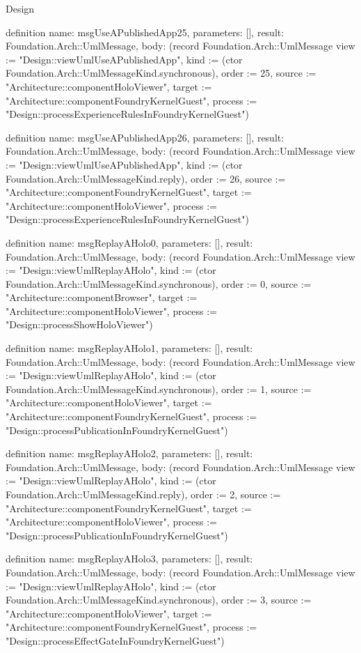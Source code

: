 \begin{lexlean}{Design}
\begin{semanticmodule}
definition{
  name: msgUseAPublishedApp25,
  parameters: [],
  result: Foundation.Arch::UmlMessage,
  body: (record Foundation.Arch::UmlMessage {view := "Design::viewUmlUseAPublishedApp", kind := (ctor Foundation.Arch::UmlMessageKind.synchronous), order := 25, source := "Architecture::componentHoloViewer", target := "Architecture::componentFoundryKernelGuest", process := "Design::processExperienceRulesInFoundryKernelGuest"})
}

definition{
  name: msgUseAPublishedApp26,
  parameters: [],
  result: Foundation.Arch::UmlMessage,
  body: (record Foundation.Arch::UmlMessage {view := "Design::viewUmlUseAPublishedApp", kind := (ctor Foundation.Arch::UmlMessageKind.reply), order := 26, source := "Architecture::componentFoundryKernelGuest", target := "Architecture::componentHoloViewer", process := "Design::processExperienceRulesInFoundryKernelGuest"})
}

definition{
  name: msgReplayAHolo0,
  parameters: [],
  result: Foundation.Arch::UmlMessage,
  body: (record Foundation.Arch::UmlMessage {view := "Design::viewUmlReplayAHolo", kind := (ctor Foundation.Arch::UmlMessageKind.synchronous), order := 0, source := "Architecture::componentBrowser", target := "Architecture::componentHoloViewer", process := "Design::processShowHoloViewer"})
}

definition{
  name: msgReplayAHolo1,
  parameters: [],
  result: Foundation.Arch::UmlMessage,
  body: (record Foundation.Arch::UmlMessage {view := "Design::viewUmlReplayAHolo", kind := (ctor Foundation.Arch::UmlMessageKind.synchronous), order := 1, source := "Architecture::componentHoloViewer", target := "Architecture::componentFoundryKernelGuest", process := "Design::processPublicationInFoundryKernelGuest"})
}

definition{
  name: msgReplayAHolo2,
  parameters: [],
  result: Foundation.Arch::UmlMessage,
  body: (record Foundation.Arch::UmlMessage {view := "Design::viewUmlReplayAHolo", kind := (ctor Foundation.Arch::UmlMessageKind.reply), order := 2, source := "Architecture::componentFoundryKernelGuest", target := "Architecture::componentHoloViewer", process := "Design::processPublicationInFoundryKernelGuest"})
}

definition{
  name: msgReplayAHolo3,
  parameters: [],
  result: Foundation.Arch::UmlMessage,
  body: (record Foundation.Arch::UmlMessage {view := "Design::viewUmlReplayAHolo", kind := (ctor Foundation.Arch::UmlMessageKind.synchronous), order := 3, source := "Architecture::componentHoloViewer", target := "Architecture::componentFoundryKernelGuest", process := "Design::processEffectGateInFoundryKernelGuest"})
}


\end{semanticmodule}
\end{lexlean}
